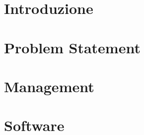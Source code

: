 \documentclass[conference]{IEEEtran}
\begin{document}
\IEEEpeerreviewmaketitle



\section{Introduzione}
\label{intro}


\section{Problem Statement}
\label{PS}


\section{Management}
\label{management}



\section{Software}
\label{software}

\end{document}
